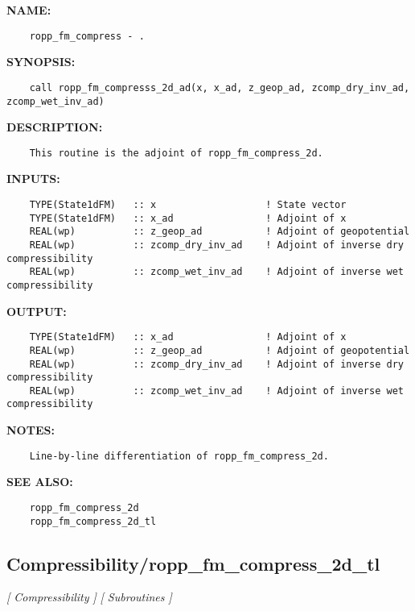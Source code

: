\label{ch:robo19}
\label{ch:Compressibility_ropp_fm_compress_2d_ad}
\textbf{NAME:}\hspace{0.08in}\begin{Verbatim}
    ropp_fm_compress - .
\end{Verbatim}
\textbf{SYNOPSIS:}\hspace{0.08in}\begin{Verbatim}
    call ropp_fm_compresss_2d_ad(x, x_ad, z_geop_ad, zcomp_dry_inv_ad, zcomp_wet_inv_ad)
\end{Verbatim}
\textbf{DESCRIPTION:}\hspace{0.08in}\begin{Verbatim}
    This routine is the adjoint of ropp_fm_compress_2d.
\end{Verbatim}
\textbf{INPUTS:}\hspace{0.08in}\begin{Verbatim}
    TYPE(State1dFM)   :: x                   ! State vector
    TYPE(State1dFM)   :: x_ad                ! Adjoint of x
    REAL(wp)          :: z_geop_ad           ! Adjoint of geopotential
    REAL(wp)          :: zcomp_dry_inv_ad    ! Adjoint of inverse dry compressibility
    REAL(wp)          :: zcomp_wet_inv_ad    ! Adjoint of inverse wet compressibility
\end{Verbatim}
\textbf{OUTPUT:}\hspace{0.08in}\begin{Verbatim}
    TYPE(State1dFM)   :: x_ad                ! Adjoint of x
    REAL(wp)          :: z_geop_ad           ! Adjoint of geopotential
    REAL(wp)          :: zcomp_dry_inv_ad    ! Adjoint of inverse dry compressibility
    REAL(wp)          :: zcomp_wet_inv_ad    ! Adjoint of inverse wet compressibility
\end{Verbatim}
\textbf{NOTES:}\hspace{0.08in}\begin{Verbatim}
    Line-by-line differentiation of ropp_fm_compress_2d.
\end{Verbatim}
\textbf{SEE ALSO:}\hspace{0.08in}\begin{Verbatim}
    ropp_fm_compress_2d
    ropp_fm_compress_2d_tl
\end{Verbatim}
\subsection{Compressibility/ropp\_fm\_compress\_2d\_tl}
\textsl{[ Compressibility ]}
\textsl{[ Subroutines ]}

